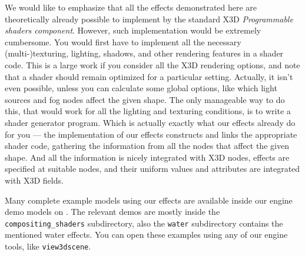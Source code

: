 \documentclass{egpubl}
\begin{document}
We would like to emphasize that all the effects demonstrated here
are theoretically already possible to implement by the standard
X3D \textit{Programmable shaders component}. However, such implementation
would be extremely cumbersome.
You would first have to implement all the necessary (multi-)texturing, lighting,
shadows, and other rendering features in a shader code.
This is a large work if you consider all the X3D rendering options, and note that
a shader should remain optimized for a particular setting.
Actually, it isn't even possible, unless you can calculate some global options,
like which light sources and fog nodes affect the given shape.
The only manageable way to do this, that would work for all the lighting
and texturing conditions, is to write a shader generator program.
Which is actually exactly what our effects already do for you ---
the implementation of our effects constructs and links
the appropriate shader code, gathering the information from all the nodes
that affect the given shape. And all the information is nicely integrated
with X3D nodes, effects are specified at suitable nodes, and their
uniform values and attributes are integrated with X3D fields.

Many complete example models using our effects
are available inside our engine demo models on
.
The relevant demos are mostly inside the \texttt{compositing\_shaders}
subdirectory, also the \texttt{water} subdirectory contains
the mentioned water effects.
You can open these examples using any of our engine tools,
like \texttt{view3dscene}.


\end{document}
